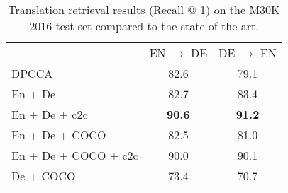\begin{table}[]
    \centering
    \begin{tabular}{lcc}
    \cmidrule[0.08em](r){1-3}
    & EN {\small $\rightarrow$} DE & DE {\small $\rightarrow$} EN \\
    \cmidrule(rl){1-3}
    DPCCA &  82.6 & 79.1 \\
    \cmidrule(rl){1-3}
    En + De & 82.7   & 83.4  \\
    En + De + c2c & \textbf{90.6} & \textbf{91.2}  \\
    En + De + COCO & 82.5    & 81.0    \\
    En + De + COCO + c2c & 90.0   & 90.1  \\
    De + COCO & 73.4 &  70.7  \\
    \cmidrule[0.08em](r){1-3}
    \end{tabular}
    \caption{Translation retrieval results (Recall @ 1) on the M30K 2016 test set compared to the state of the art.}
    \label{tab:translate}
\end{table}

